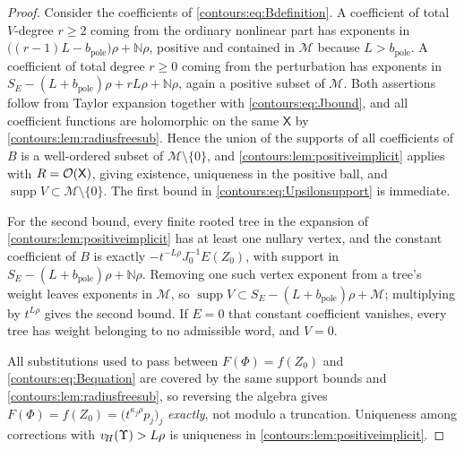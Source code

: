 \documentclass[11pt,letterpaper]{article}
\theoremstyle{definition}
\theoremstyle{remark}
\newcommand{\N}{\mathbb N}\newcommand{\Z}{\mathbb Z}\newcommand{\DD}{\mathbb D}
\newcommand{\supp}{\operatorname{supp}}\newcommand{\Res}{\operatorname{Res}}
\numberwithin{equation}{section}
\begin{document}
\begin{proof}
Consider the coefficients of \eqref{contours:eq:Bdefinition}. A coefficient of
total $V$-degree $r\ge2$ coming from the ordinary nonlinear part has exponents in
$\bigl((r-1)L-b_{\mathrm{pole}}\bigr)\rho+\N\rho$, positive and contained in
$\mathcal M$ because $L>b_{\mathrm{pole}}$. A coefficient of total degree
$r\ge0$ coming from the perturbation has exponents in
$S_E-(L+b_{\mathrm{pole}})\rho+rL\rho+\N\rho$, again a positive subset of
$\mathcal M$. Both assertions follow from Taylor expansion together with
\eqref{contours:eq:Jbound}, and all coefficient functions are holomorphic on the
same $\mathsf X$ by \cref{contours:lem:radiusfreesub}. Hence the union of the
supports of all coefficients of $B$ is a well-ordered subset of
$\mathcal M\setminus\{0\}$, and \cref{contours:lem:positiveimplicit} applies with
$R=\mathcal O(\mathsf X)$, giving existence, uniqueness in the positive ball, and
$\supp V\subset\mathcal M\setminus\{0\}$. The first bound in
\eqref{contours:eq:Upsilonsupport} is immediate.

For the second bound, every finite rooted tree in the expansion of
\cref{contours:lem:positiveimplicit} has at least one nullary vertex, and the
constant coefficient of $B$ is exactly $-t^{-L\rho}J_0^{-1}E(Z_0)$, with support
in $S_E-(L+b_{\mathrm{pole}})\rho+\N\rho$. Removing one such vertex exponent from
a tree's weight leaves exponents in $\mathcal M$, so
$\supp V\subset S_E-(L+b_{\mathrm{pole}})\rho+\mathcal M$; multiplying by
$t^{L\rho}$ gives the second bound. If $E=0$ that constant coefficient vanishes,
every tree has weight belonging to no admissible word, and $V=0$.

All substitutions used to pass between $F(\Phi)=f(Z_0)$ and
\eqref{contours:eq:Bequation} are covered by the same support bounds and
\cref{contours:lem:radiusfreesub}, so reversing the algebra gives
$F(\Phi)=f(Z_0)=\bigl(t^{\kappa_j\rho}p_j\bigr)_j$ \emph{exactly}, not modulo a
truncation. Uniqueness among corrections with $v_{\!H}(\Upsilon)>L\rho$ is
uniqueness in \cref{contours:lem:positiveimplicit}.
\end{proof}
\end{document}
